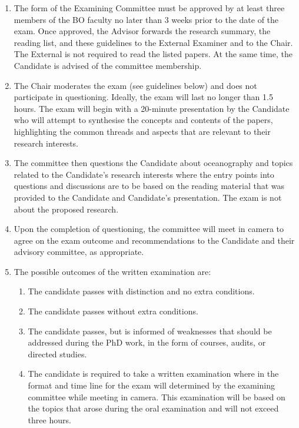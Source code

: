 \begin{enumerate}
\item The form of the Examining Committee must be approved by at least three members of the BO faculty no later than 3 weeks prior to the date of the exam. Once approved, the Advisor forwards the research summary, the reading list, and these guidelines to the External Examiner and to the Chair. The External is not required to read the listed papers. At the same time, the Candidate is advised of the committee membership. 

\item The Chair moderates the exam (see guidelines below) and does not participate in questioning. Ideally, the exam will last no longer than 1.5 hours. The exam will begin with a 20-minute presentation by the Candidate who will attempt to synthesise the concepts and contents of the papers, highlighting the common threads and aspects that are relevant to their research interests.

\item The committee then questions the Candidate about oceanography and topics related to the Candidate’s research interests where the entry points into questions and discussions are to be based on the reading material that was provided to the Candidate and Candidate’s presentation. The exam is not about the proposed research.

\item Upon the completion of questioning, the committee will meet in camera to agree on the exam outcome and recommendations to the Candidate and their advisory committee, as appropriate.

\item The possible outcomes of the written examination are:
\begin{enumerate}
\item The candidate passes with distinction and no extra conditions.
\item The candidate passes without extra conditions.
\item The candidate passes, but is informed of weaknesses that should be addressed during the PhD work, in the form of courses, audits, or directed studies.
\item The candidate is required to take a written examination where in the format and time line for the exam will determined by the examining committee while meeting in camera. This examination will be based on the topics that arose during the oral examination and will not exceed three hours. 
\end{enumerate}


\end{enumerate}
